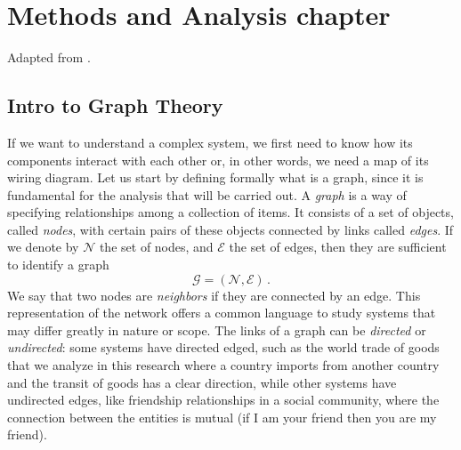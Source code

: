 \chapter{Methods and Analysis chapter}



Adapted from \textcite{barabasi2016network,easley2012networks}.

\section{Intro to Graph Theory}

If we want to understand a complex system, we first need to know how its components interact with each other or, in other words, we need a map of its wiring diagram.
Let us start by defining formally what is a graph, since it is fundamental for the analysis that will be carried out. 
A \textit{graph} is a way of specifying relationships among a collection of items. It consists of a set of objects, called \textit{nodes}, with certain pairs of these objects connected by links called \textit{edges}. If we denote by $\mathcal{N}$ the set of nodes, and $\mathcal{E}$ the set of edges, then they are sufficient to identify a graph 
\[ \mathcal{G} = (\mathcal{N},\mathcal{E})\,. \]
We say that two nodes are \textit{neighbors} if they are connected by an edge. This representation of the network offers a common language to study systems that may differ greatly in nature or scope. The links of a graph can be \textit{directed} or \textit{undirected}: some systems have directed edged, such as the world trade of goods that we analyze in this research where a country imports from another country and the transit of goods has a clear direction, while other systems have undirected edges, like friendship relationships in a social community, where the connection between the entities is mutual (if I am your friend then you are my friend).

